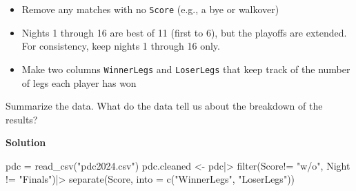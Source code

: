 \documentclass[
]{article}
\newenvironment{Shaded}{\begin{snugshade}}{\end{snugshade}}
\newcommand{\AttributeTok}[1]{\textcolor[rgb]{0.40,0.45,0.13}{#1}}
\newcommand{\FunctionTok}[1]{\textcolor[rgb]{0.28,0.35,0.67}{#1}}
\newcommand{\NormalTok}[1]{\textcolor[rgb]{0.00,0.23,0.31}{#1}}
\newcommand{\OtherTok}[1]{\textcolor[rgb]{0.00,0.23,0.31}{#1}}
\newcommand{\SpecialCharTok}[1]{\textcolor[rgb]{0.37,0.37,0.37}{#1}}
\newcommand{\StringTok}[1]{\textcolor[rgb]{0.13,0.47,0.30}{#1}}
\providecommand{\tightlist}{%
  \setlength{\itemsep}{0pt}\setlength{\parskip}{0pt}}
\begin{document}
\begin{itemize}
\tightlist
\item
  Remove any matches with no \texttt{Score} (e.g., a bye or walkover)
\item
  Nights 1 through 16 are best of 11 (first to 6), but the playoffs are
  extended. For consistency, keep nights 1 through 16 only.
\item
  Make two columns \texttt{WinnerLegs} and \texttt{LoserLegs} that keep
  track of the number of legs each player has won
\end{itemize}

Summarize the data. What do the data tell us about the breakdown of the
results?

\textbf{Solution}

\normalsize

\begin{Shaded}
\begin{Highlighting}[numbers=left,,]
\NormalTok{pdc }\OtherTok{=} \FunctionTok{read\_csv}\NormalTok{(}\StringTok{"pdc2024.csv"}\NormalTok{)}
\NormalTok{pdc.cleaned }\OtherTok{\textless{}{-}}\NormalTok{ pdc}\SpecialCharTok{|\textgreater{}}
  \FunctionTok{filter}\NormalTok{(Score}\SpecialCharTok{!=} \StringTok{"w/o"}\NormalTok{,}
\NormalTok{        Night }\SpecialCharTok{!=} \StringTok{"Finals"}\NormalTok{)}\SpecialCharTok{|\textgreater{}}
  \FunctionTok{separate}\NormalTok{(Score, }\AttributeTok{into =} \FunctionTok{c}\NormalTok{(}\StringTok{"WinnerLegs"}\NormalTok{, }\StringTok{"LoserLegs"}\NormalTok{))}
\end{Highlighting}
\end{Shaded}

\normalsize

\normalsize
\end{document}
